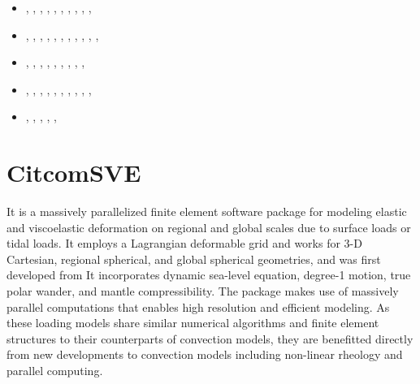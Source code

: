 \begin{small}
\begin{itemize}
\item[\twothousandtwenty]    \textcite{weki20},  \textcite{braf20},  \textcite{pagh20},
                             \textcite{vamg20},  \textcite{heyg20},  \textcite{loru20}, 
                             \textcite{bill20},  \textcite{sele20},
                             \textcite{dazl20},  \textcite{wali20}, 
\item[\twothousandtwentyone] \textcite{cafm21},  \textcite{ligl21},  \textcite{lule21},
                             \textcite{scvg21},  \textcite{ligl21b}, \textcite{maba21},
                             \textcite{wali21},  \textcite{cafb21},  \textcite{mazh21a}
                             \textcite{hulg21},  \textcite{moma21},  \textcite{sabp21},
                             \textcite{mazh21b}
\item[\twothousandtwentytwo] \textcite{limc22},  \textcite{scva22},  \textcite{yuli22},
                             \textcite{flbw22},  \textcite{kibm22},  \textcite{rojy22},
                             \textcite{ghpa22},  \textcite{maba22},  \textcite{peli22},
                             \textcite{fube22}
\item[\twothousandtwentythree] \textcite{li__23}, \textcite{lilz23}, \textcite{bofl23},
                               \textcite{hagl23}, \textcite{wacp23}, \textcite{lilw23},
                               \textcite{zhzl23}, \textcite{li__23}, \textcite{befu23},
                               \textcite{pacb23}, \textcite{tumk23}
\item[\twothousandtwentyfour]  \textcite{bero24}, \textcite{lobb24}, \textcite{muki24},
                               \textcite{wefl24}, \textcite{sawb24}, \textcite{docl24}
\end{itemize}
\end{small}


\section{CitcomSVE} 

It is a massively parallelized finite element software package for modeling elastic 
and viscoelastic deformation on regional and global scales due to 
surface loads or tidal loads. 
It employs a Lagrangian deformable grid and works for 3-D Cartesian, 
regional spherical, and global spherical geometries, and was first developed from \citcoms
It incorporates dynamic sea-level equation, degree-1 motion, true polar wander, 
and mantle compressibility. The package makes use of massively parallel computations 
that enables high resolution and efficient modeling. 
As these loading models share similar numerical algorithms and finite element 
structures to their counterparts of convection models, they are benefitted directly 
from new developments to convection models including non-linear rheology and parallel computing. 

